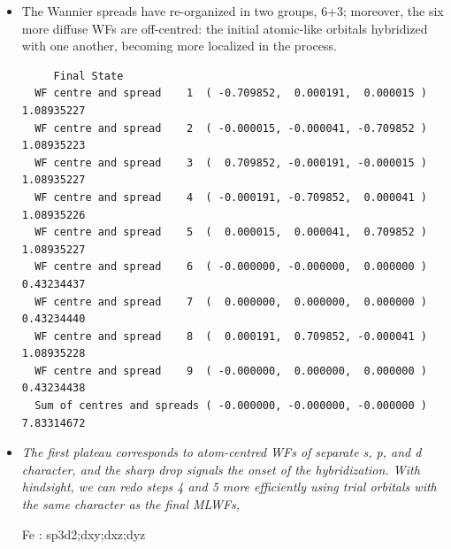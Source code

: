 \begin{itemize}
	\item  The Wannier spreads have re-organized in two groups, 6+3; moreover, the six more diffuse WFs are off-centred: the initial atomic-like orbitals hybridized with one another, becoming more localized in the process.
    \newpage
      \begin{tcolorbox}[sharp corners,boxrule=0.5pt]
  {\small
	\begin{verbatim}
	 Final State
  WF centre and spread    1  ( -0.709852,  0.000191,  0.000015 )     1.08935227
  WF centre and spread    2  ( -0.000015, -0.000041, -0.709852 )     1.08935223
  WF centre and spread    3  (  0.709852, -0.000191, -0.000015 )     1.08935227
  WF centre and spread    4  ( -0.000191, -0.709852,  0.000041 )     1.08935226
  WF centre and spread    5  (  0.000015,  0.000041,  0.709852 )     1.08935227
  WF centre and spread    6  ( -0.000000, -0.000000,  0.000000 )     0.43234437
  WF centre and spread    7  (  0.000000,  0.000000,  0.000000 )     0.43234440
  WF centre and spread    8  (  0.000191,  0.709852, -0.000041 )     1.08935228
  WF centre and spread    9  ( -0.000000,  0.000000,  0.000000 )     0.43234438
  Sum of centres and spreads ( -0.000000, -0.000000, -0.000000 )     7.83314672
	\end{verbatim}
	}
	\end{tcolorbox}

	\item {\it The first plateau corresponds to atom-centred WFs of separate s, p, and d character, and the sharp
drop signals the onset of the hybridization. With hindsight, we can redo steps 4 and 5 more efficiently
using trial orbitals with the same character as the final MLWFs,
{\tt

Fe : sp3d2;dxy;dxz;dyz

}}
\end{itemize}
